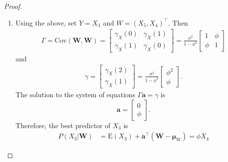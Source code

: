 \documentclass[12pt]{article}
\theoremstyle{definition}
\newcommand{\E}{\text{E}}
\newcommand{\Co}[2]{\text{Cov}\left({#1}, {#2}\right)}
\newcommand{\vect}[1]{\boldsymbol{#1}}
\begin{document}
\begin{proof}
\begin{enumerate}
    \item Using the above, set $Y = X_3$ and $W = (X_5, X_4)^\intercal$. Then
      \begin{align*}
        \Gamma = \Co{\vect{W}}{\vect{W}} =
        \begin{bmatrix} \gamma_X(0) & \gamma_X(1) \\ \gamma_X(1) & \gamma_X(0) \end{bmatrix} =
        \frac{\sigma^2}{1-\phi^2} \begin{bmatrix} 1  & \phi \\ \phi & 1 \end{bmatrix}
      \end{align*}
      and
      \begin{align*}
        \gamma = \begin{bmatrix} \gamma_X(2) \\ \gamma_X(1) \end{bmatrix}
        =  \frac{\sigma^2}{1-\phi^2} \begin{bmatrix} \phi^2 \\ \phi \end{bmatrix}.
      \end{align*}
      The solution to the system of equations $\Gamma \vect{a} = \gamma$ is
      $$\vect{a} = \begin{bmatrix} 0 \\ \phi \end{bmatrix}.$$
      Therefore, the best predictor of $X_3$ is
      \begin{align*}
        P(X_3|\vect{W}) &= \E(X_3) + \vect{a}^\intercal (\vect{W} - \vect{\mu}_W) = \phi X_4
      \end{align*}


\end{enumerate}
\end{proof}
\end{document}

